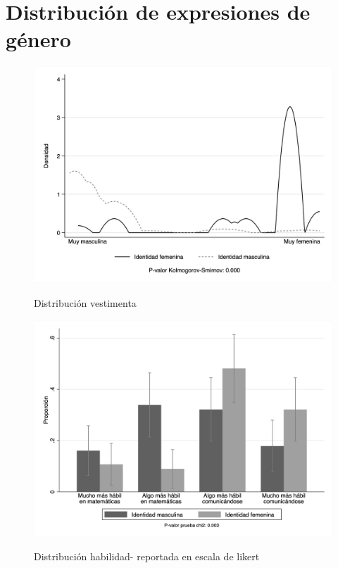 \section{Distribución de expresiones de género}
\begin{figure}[!ht]
	\centering
	\caption{Distribución vestimenta}
	\includegraphics[width=13cm]{Images/dress_score_gender.png}
	\label{fig:dress_dist}
\end{figure}
\begin{figure}[!ht]
	\centering
	\caption{Distribución habilidad- reportada en escala de likert}
	\includegraphics[width=12cm]{Images/ability_likert.png}
	\label{fig:ability_dist}
\end{figure}
